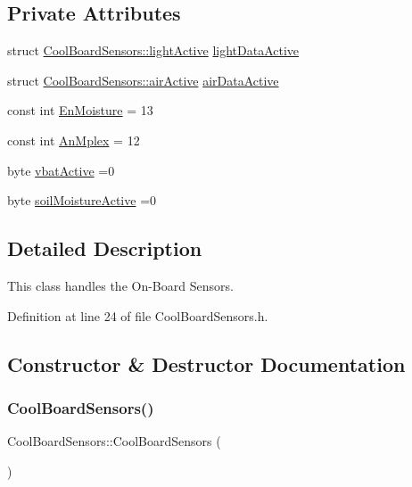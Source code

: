 \subsection*{Private Attributes}
\begin{DoxyCompactItemize}
\item 
struct \hyperlink{struct_cool_board_sensors_1_1light_active}{Cool\+Board\+Sensors\+::light\+Active} \hyperlink{class_cool_board_sensors_ac4deb1cf41bac8b91c780c92fab00ba4}{light\+Data\+Active}
\item 
struct \hyperlink{struct_cool_board_sensors_1_1air_active}{Cool\+Board\+Sensors\+::air\+Active} \hyperlink{class_cool_board_sensors_abff8dfeccb2f7689847bb64d5f1cd31e}{air\+Data\+Active}
\item 
const int \hyperlink{class_cool_board_sensors_a6177d02e14a057a2f171a2e930b5038d}{En\+Moisture} = 13
\item 
const int \hyperlink{class_cool_board_sensors_a12ef28b1046219e0aee10bf64e28c4a5}{An\+Mplex} = 12
\item 
byte \hyperlink{class_cool_board_sensors_af5039ad760b0ff0aa7eee16c55e81702}{vbat\+Active} =0
\item 
byte \hyperlink{class_cool_board_sensors_a31983eecc0f9cd000e1f912206ea4dc8}{soil\+Moisture\+Active} =0
\end{DoxyCompactItemize}


\subsection{Detailed Description}
This class handles the On-\/\+Board Sensors. 

Definition at line 24 of file Cool\+Board\+Sensors.\+h.



\subsection{Constructor \& Destructor Documentation}
\mbox{\label{class_cool_board_sensors_a91ff2a02f5486f90cf2413a1cf8a9ed4}} 
\subsubsection{\texorpdfstring{Cool\+Board\+Sensors()}{CoolBoardSensors()}}
{\footnotesize\ttfamily Cool\+Board\+Sensors\+::\+Cool\+Board\+Sensors (\begin{DoxyParamCaption}{ }\end{DoxyParamCaption})}

